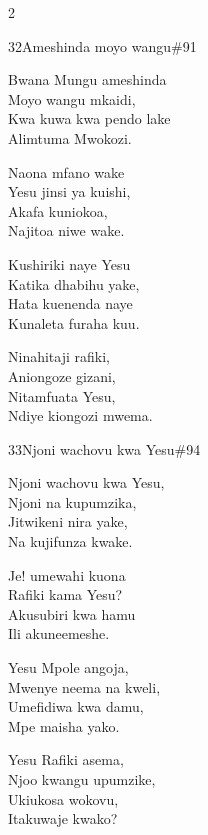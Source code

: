 \documentclass{article}
\begin{document}
\begin{multicols}{2}
\begin{hymn}{32}{Ameshinda moyo wangu}{\#91}
\begin{stanza}
Bwana Mungu ameshinda\\
Moyo wangu mkaidi,\\
Kwa kuwa kwa pendo lake\\
Alimtuma Mwokozi.
\end{stanza}
\begin{chorus}
Naona mfano wake\\
Yesu jinsi ya kuishi,\\
Akafa kuniokoa,\\
Najitoa niwe wake.
\end{chorus}
\begin{stanza}
Kushiriki naye Yesu\\
Katika dhabihu yake,\\
Hata kuenenda naye\\
Kunaleta furaha kuu.
\end{stanza}
\begin{stanza}
Ninahitaji rafiki,\\
Aniongoze gizani,\\
Nitamfuata Yesu,\\
Ndiye kiongozi mwema.
\end{stanza}
\end{hymn}

\begin{hymn}{33}{Njoni wachovu kwa Yesu}{\#94}
\begin{stanza}
Njoni wachovu kwa Yesu,\\
Njoni na kupumzika,\\
Jitwikeni nira yake,\\
Na kujifunza kwake.
\end{stanza}
\begin{chorus}
Je! umewahi kuona\\
Rafiki kama Yesu?\\
Akusubiri kwa hamu\\
Ili akuneemeshe.
\end{chorus}
\begin{stanza}
Yesu Mpole angoja,\\
Mwenye neema na kweli,\\
Umefidiwa kwa damu,\\
Mpe maisha yako.
\end{stanza}
\begin{stanza}
Yesu Rafiki asema,\\
Njoo kwangu upumzike,\\
Ukiukosa wokovu,\\
Itakuwaje kwako?
\end{stanza}
\end{hymn}


\end{multicols}
\end{document}
